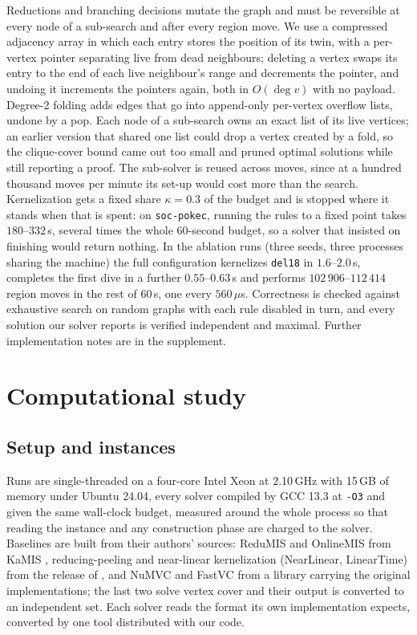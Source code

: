 \documentclass[review,authoryear,11pt]{elsarticle}
\theoremstyle{definition}
\begin{document}
Reductions and branching decisions mutate the graph and must be reversible at every
node of a sub-search and after every region move. We use a compressed adjacency
array in which each entry stores the position of its twin, with a per-vertex pointer
separating live from dead neighbours; deleting a vertex swaps its entry to the end of
each live neighbour's range and decrements the pointer, and undoing it increments the
pointers again, both in $O(\deg v)$ with no payload. Degree-2 folding adds edges that
go into append-only per-vertex overflow lists, undone by a pop. Each node of a
sub-search owns an exact list of its live vertices; an earlier version that shared one
list could drop a vertex created by a fold, so the clique-cover bound came out too
small and pruned optimal solutions while still reporting a proof. The sub-solver is
reused across moves, since at a hundred thousand moves per minute its set-up would
cost more than the search. Kernelization gets a fixed share $\kappa=0.3$ of the
budget and is stopped where it stands when that is spent: on \texttt{soc-pokec},
running the rules to a fixed point takes $180$--$332$\,s, several times the whole
60-second budget, so a solver that insisted on finishing would return nothing. In the
ablation runs (three seeds, three processes sharing the machine) the full
configuration kernelizes \texttt{del18} in $1.6$--$2.0$\,s, completes the first dive in
a further $0.55$--$0.63$\,s and performs $102\,906$--$112\,414$ region moves in the
rest of 60\,s, one every $560\,\mu$s. Correctness is checked against exhaustive search
on random graphs with each rule disabled in turn, and every solution our solver reports
is verified independent and maximal. Further implementation notes are in the
supplement.
\section{Computational study}
\label{sec:experiments}

\subsection{Setup and instances}
\label{sec:setup-machine}

Runs are single-threaded on a four-core Intel Xeon at 2.10\,GHz with 15\,GB of
memory under Ubuntu 24.04, every solver compiled by GCC 13.3 at \texttt{-O3} and
given the same wall-clock budget, measured around the whole process so that reading
the instance and any construction phase are charged to the solver. Baselines are
built from their authors' sources: ReduMIS and OnlineMIS from KaMIS
\citep{lamm2017,dahlum2016}, reducing-peeling and near-linear kernelization (NearLinear,
LinearTime) from the release of \citet{chang2017}, and NuMVC and FastVC from a library
carrying the original implementations; the last two solve vertex cover and their
output is converted to an independent set. Each solver reads the format its own
implementation expects, converted by one tool distributed with our code.
\end{document}
